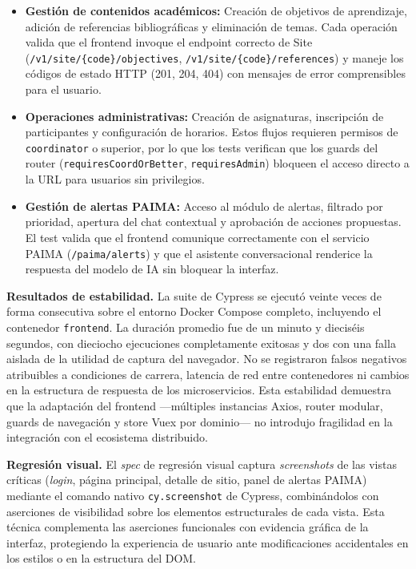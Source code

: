 \begin{itemize}
    \item \textbf{Gestión de contenidos académicos:} Creación de objetivos de
    aprendizaje, adición de referencias bibliográficas y eliminación de temas. Cada
    operación valida que el frontend invoque el endpoint correcto de Site
    (\texttt{/v1/site/\{code\}/objectives}, \texttt{/v1/site/\{code\}/references})
    y maneje los códigos de estado HTTP (201, 204, 404) con mensajes de error
    comprensibles para el usuario.
    \item \textbf{Operaciones administrativas:} Creación de asignaturas,
    inscripción de participantes y configuración de horarios. Estos flujos requieren
    permisos de \texttt{coordinator} o superior, por lo que los tests verifican que
    los guards del router (\texttt{requiresCoordOrBetter},
    \texttt{requiresAdmin}) bloqueen el acceso directo a la URL para usuarios sin
    privilegios.
    \item \textbf{Gestión de alertas PAIMA:} Acceso al módulo de alertas,
    filtrado por prioridad, apertura del chat contextual y aprobación de acciones
    propuestas. El test valida que el frontend comunique correctamente con el
    servicio PAIMA (\texttt{/paima/alerts}) y que el asistente conversacional
    renderice la respuesta del modelo de IA sin bloquear la interfaz.
\end{itemize}

\textbf{Resultados de estabilidad.} La suite de Cypress se ejecutó veinte veces de
forma consecutiva sobre el entorno Docker Compose completo, incluyendo el contenedor
\texttt{frontend}. La duración promedio fue de un minuto
y dieciséis segundos, con dieciocho ejecuciones completamente exitosas y dos con
una falla aislada de la utilidad de captura del navegador. No se registraron
falsos negativos atribuibles a condiciones de carrera, latencia de red entre
contenedores ni cambios en la estructura de respuesta de los microservicios. Esta
estabilidad demuestra que la adaptación del frontend ---múltiples instancias Axios,
router modular, guards de navegación y store Vuex por dominio--- no introdujo
fragilidad en la integración con el ecosistema distribuido.

\textbf{Regresión visual.} El \textit{spec} de regresión visual captura
\textit{screenshots} de las vistas críticas (\textit{login}, página principal,
detalle de sitio, panel de alertas PAIMA) mediante el comando nativo
\texttt{cy.screenshot} de Cypress, combinándolos con aserciones de visibilidad
sobre los elementos estructurales de cada vista. Esta técnica complementa las
aserciones funcionales con evidencia gráfica de la interfaz, protegiendo la
experiencia de usuario ante modificaciones accidentales en los estilos o en la
estructura del DOM.

